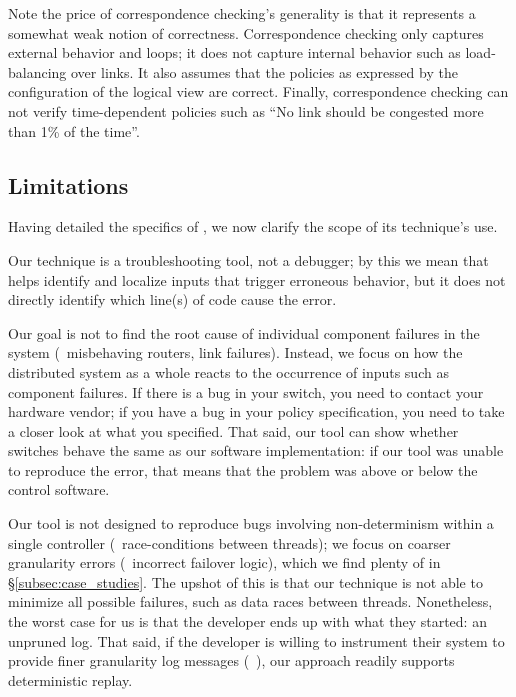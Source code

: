 Note the price of correspondence checking's generality is that it represents
a somewhat weak notion of
correctness. Correspondence checking only captures external behavior and
loops; it does not capture internal behavior such as load-balancing
over links. It also assumes that the policies as expressed by the
configuration of the logical view are correct. Finally, correspondence
checking can not verify
time-dependent policies such as ``No link should be congested more than 1\% of
the time''.

\subsection{Limitations}
\label{subsec:non_goals}

Having detailed the specifics of \simulator, we now
clarify the scope of its technique's use.

 Our technique is a troubleshooting tool, not a debugger;
by this we mean that \simulator{} helps identify and localize inputs that
trigger erroneous behavior, but it does not directly identify which
line(s) of code cause the error.

 Our goal is not to find the root
cause of individual component failures in the system (\eg~misbehaving routers,
link failures). Instead, we focus on
how the distributed system as a whole reacts to the occurrence of inputs such
as component failures.
If there is a bug in your switch, you need to contact your hardware vendor;
if you have a bug in your policy specification, you need to take a closer look at what you specified.
That said, our tool can show whether switches behave the same as our software
implementation: if our tool was unable to reproduce the error, that means that
the problem was above or below the control software.

 Our tool is not designed to reproduce bugs
involving non-determinism within a single controller (\eg~race-conditions between threads);
we focus on coarser granularity errors (\eg~incorrect failover logic), which we find plenty of
in \S\ref{subsec:case_studies}. The upshot of
this is that our technique is not able to minimize all possible failures, such as
data races between threads.
Nonetheless, the worst case for us is that the developer ends up with what they started:
an unpruned log. That said, if the developer is willing to instrument their system to
provide finer granularity log messages (\cf~\cite{Geels:2006:RDD:1267359.1267386}),
our approach readily supports deterministic replay.

